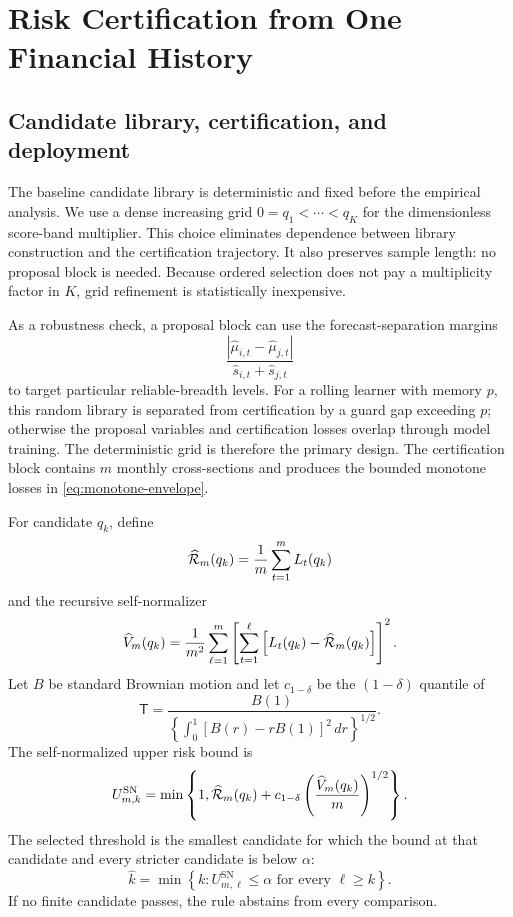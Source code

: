 \section{Risk Certification from One Financial History}
\label{sec:certification}

\subsection{Candidate library, certification, and deployment}

The baseline candidate library is deterministic and fixed before the empirical analysis. We use a dense increasing grid $0=q_1<\cdots<q_K$ for the dimensionless score-band multiplier. This choice eliminates dependence between library construction and the certification trajectory. It also preserves sample length: no proposal block is needed. Because ordered selection does not pay a multiplicity factor in $K$, grid refinement is statistically inexpensive.

As a robustness check, a proposal block can use the forecast-separation margins
\[
\frac{
|\widehat\mu_{i,t}-\widehat\mu_{j,t}|
}{
\widehat s_{i,t}+\widehat s_{j,t}
}
\]
to target particular reliable-breadth levels. For a rolling learner with memory $p$, this random library is separated from certification by a guard gap exceeding $p$; otherwise the proposal variables and certification losses overlap through model training. The deterministic grid is therefore the primary design. The certification block contains $m$ monthly cross-sections and produces the bounded monotone losses in \eqref{eq:monotone-envelope}.

For candidate $q_k$, define
\begin{equation}
\widehat{\mathcal R}_m(q_k)
=
\frac1m\sum_{t=1}^{m}L_t(q_k)
\label{eq:empirical-risk}
\end{equation}
and the recursive self-normalizer
\begin{equation}
\widehat V_m(q_k)
=
\frac{1}{m^2}
\sum_{\ell=1}^{m}
\left[
\sum_{t=1}^{\ell}
\left[L_t(q_k)-\widehat{\mathcal R}_m(q_k)\right]
\right]^2.
\label{eq:self-normalizer-finance}
\end{equation}
Let $B$ be standard Brownian motion and let $c_{1-\delta}$ be the $(1-\delta)$ quantile of
\begin{equation}
\mathsf T
=
\frac{B(1)}{
\left\{
\int_0^1[B(r)-rB(1)]^2\,dr
\right\}^{1/2}}.
\label{eq:brownian-pivot-finance}
\end{equation}
The self-normalized upper risk bound is
\begin{equation}
U_{m,k}^{\mathrm{SN}}
=
\min\left\{
1,
\widehat{\mathcal R}_m(q_k)
+
c_{1-\delta}
\left(
\frac{\widehat V_m(q_k)}{m}
\right)^{1/2}
\right\}.
\label{eq:sn-ucb-finance}
\end{equation}
The selected threshold is the smallest candidate for which the bound at that candidate and every stricter candidate is below $\alpha$:
\begin{equation}
\widehat k
=
\min\left\{
k:
U_{m,\ell}^{\mathrm{SN}}\leq\alpha
\text{ for every }\ell\geq k
\right\}.
\label{eq:finance-selector}
\end{equation}
If no finite candidate passes, the rule abstains from every comparison.

